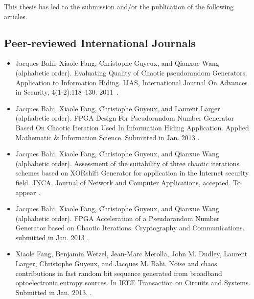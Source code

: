 This thesis has led to the submission and/or the publication of the following articles.
\subsection{Peer-reviewed International Journals}
\begin{itemize}
\item Jacques Bahi, Xiaole Fang, Christophe Guyeux, and Qianxue Wang (alphabetic order). Evaluating Quality of Chaotic pseudorandom Generators. Application to Information Hiding. IJAS, International Journal On Advances in Security, 4(1-2):118--130. 2011~\cite{bfgw11:ij}.
\end{itemize}

\begin{itemize}
\item Jacques Bahi, Xiaole Fang, Christophe Guyeux, and Laurent Larger (alphabetic order). FPGA Design For Pseudorandom Number Generator Based On Chaotic Iteration Used In Information Hiding Application. Applied Mathematic \& Information Science. Submitted in Jan. 2013 \cite{submit1}.
\end{itemize}

\begin{itemize}
\item Jacques Bahi, Xiaole Fang, Christophe Guyeux, and Qianxue Wang (alphabetic order). Assessment of the suitability of three chaotic iterations schemes based on XORshift Generator for application in the Internet security field. JNCA, Journal of Network and Computer Applications, accepted. To appear \cite{submit2}.
\end{itemize}

\begin{itemize}
\item Jacques Bahi, Xiaole Fang, Christophe Guyeux, and Qianxue Wang (alphabetic order). FPGA Acceleration of a Pseudorandom Number Generator based on Chaotic Iterations. Cryptography and Communications. submitted in Jan. 2013 \cite{submit3}.
\end{itemize}

\begin{itemize}
 \item Xiaole Fang, Benjamin Wetzel, Jean-Marc Merolla, John M. Dudley, Laurent Larger,
Christophe Guyeux, and Jacques M. Bahi. Noise and chaos contributions in fast
random bit sequence generated from broadband optoelectronic entropy sources. In
IEEE Transaction on Circuits and Systems. Submitted in Jan. 2013.
\cite{submit4}.
\end{itemize}



